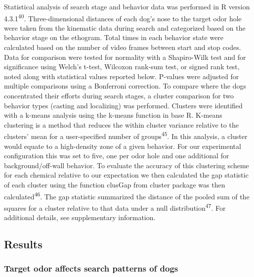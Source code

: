 \documentclass[
]{article}
\begin{document}
Statistical analysis of search stage and behavior data was performed in R version 4.3.1\textsuperscript{40}. Three-dimensional distances of each dog's nose to the target odor hole were taken from the kinematic data during search and categorized based on the behavior stage on the ethogram. Total times in each behavior state were calculated based on the number of video frames between start and stop codes. Data for comparison were tested for normality with a Shapiro-Wilk test and for significance using Welch's t-test, Wilcoxon rank-sum test, or signed rank test, noted along with statistical values reported below. P-values were adjusted for multiple comparisons using a Bonferroni correction. To compare where the dogs concentrated their efforts during search stages, a cluster comparison for two behavior types (casting and localizing) was performed. Clusters were identified with a k-means analysis using the k-means function in base R. K-means clustering is a method that reduces the within cluster variance relative to the clusters' mean for a user-specified number of groups\textsuperscript{45}. In this analysis, a cluster would equate to a high-density zone of a given behavior. For our experimental configuration this was set to five, one per odor hole and one additional for background/off-wall behavior. To evaluate the accuracy of this clustering scheme for each chemical relative to our expectation we then calculated the gap statistic of each cluster using the function clusGap from cluster package was then calculated\textsuperscript{46}. The gap statistic summarized the distance of the pooled sum of the squares for a cluster relative to that data under a null distribution\textsuperscript{47}. For additional details, see supplementary information.

\hypertarget{results}{%
\subsection{Results}\label{results}}

\hypertarget{target-odor-affects-search-patterns-of-dogs}{%
\subsubsection{Target odor affects search patterns of dogs}\label{target-odor-affects-search-patterns-of-dogs}}
\end{document}
